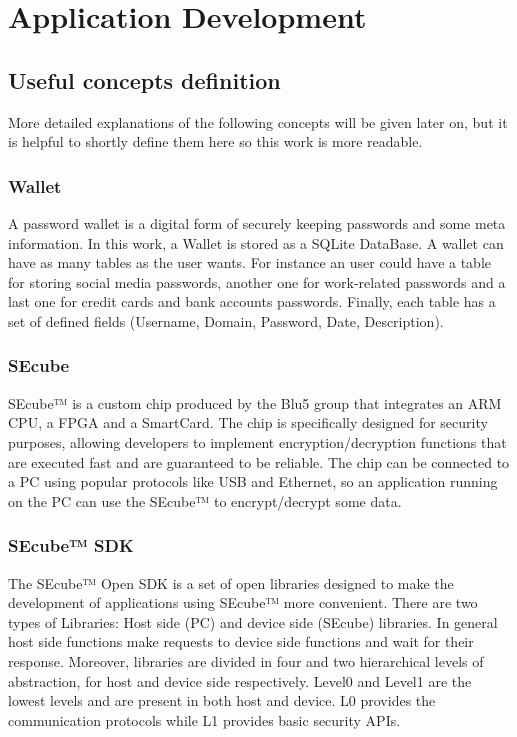 \chapter{Application Development}


\section{Useful concepts definition}

More detailed explanations of the following concepts will be given later on, but it is helpful to shortly define them here so this work is more readable.

\subsection{Wallet} A password wallet is a digital form of securely keeping passwords and some meta information. In this work, a Wallet is stored as a SQLite DataBase. A wallet can have as many tables as the user wants. For instance an user could have a table for storing social media passwords, another one for work-related passwords and a last one for credit cards and bank accounts passwords. Finally, each table has a set of defined fields (Username, Domain, Password, Date, Description).

\subsection{SEcube} SEcube™ is a custom chip produced by the Blu5 group \cite{Blu5} that integrates an ARM CPU, a FPGA and a SmartCard. The chip is specifically designed for security purposes, allowing developers to implement encryption/decryption functions that are executed fast and are guaranteed to be reliable. The chip can be connected to a PC using popular protocols like USB and Ethernet, so an application running on the PC can use the SEcube™ to encrypt/decrypt some data.

\subsection{SEcube™ SDK} The SEcube™ Open SDK is a set of open libraries designed to make the development of applications using SEcube™ more convenient. There are two types of Libraries: Host side (PC) and device side (SEcube) libraries. In general host side functions make requests to device side functions and wait for their response. Moreover, libraries are divided in four and two hierarchical levels of abstraction, for host and device side respectively. Level0 and Level1 are the lowest levels and are present in both host and device. L0 provides the communication protocols while L1 provides basic security APIs.

